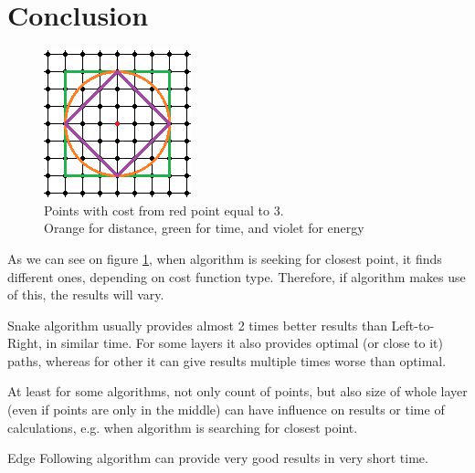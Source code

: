 \documentclass[titlepage]{article}
\begin{document}
\section{Conclusion}
\begin{figure}
\begin{center}
\includegraphics[scale=2]{img/costs}
\end{center}
\caption{Points with cost from red point equal to 3.\\Orange for distance, green for time, and violet for energy}
\label{cost_function_representation}
\end{figure}
As we can see on figure \ref{cost_function_representation}, when algorithm is seeking for closest point, it finds different ones, depending on cost function type. Therefore, if algorithm makes use of this, the results will vary.

Snake algorithm usually provides almost 2 times better results than Left-to-Right, in similar time. For some layers it also provides optimal (or close to it) paths, whereas for other it can give results multiple times worse than optimal.

At least for some algorithms, not only count of points, but also size of whole layer (even if points are only in the middle) can have influence on results or time of calculations, e.g. when algorithm is searching for closest point.

Edge Following algorithm can provide very good results in very short time.
\end{document}
